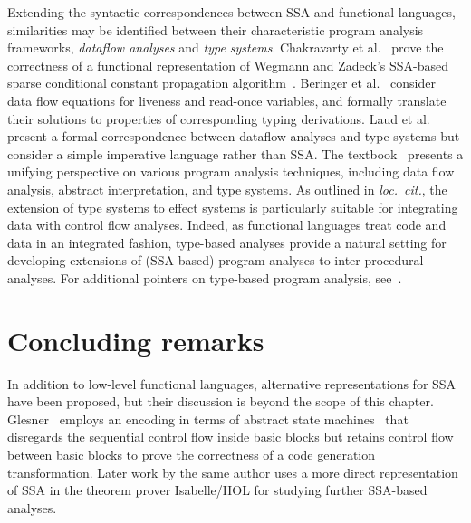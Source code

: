 
Extending the syntactic correspondences between SSA and functional
languages, similarities may be identified between their characteristic
program analysis frameworks, \emph{dataflow analyses} and \emph{type
systems}.  Chakravarty et al.~\cite{ChakravartyKZ:COCV03} prove the
correctness of a functional representation of Wegmann and Zadeck's
SSA-based sparse conditional constant propagation
algorithm~\cite{WegmannZ:Toplas1991}.  Beringer et
al.~\cite{DBLP:journals/entcs/BeringerMS03} consider data flow
equations for liveness and read-once variables, and formally translate
their solutions to properties of corresponding typing derivations.
Laud et al.~\cite{DBLP:journals/tcs/LaudUV06} present a formal
correspondence between dataflow analyses and type systems but consider
a simple imperative language rather than SSA. The
textbook~\cite{DBLP:books/daglib/0015430} presents a unifying
perspective on various program analysis techniques, including data
flow analysis, abstract interpretation, and type systems. As outlined
in \emph{loc.~cit.}, the extension of type systems to effect systems
is particularly suitable for integrating data with control flow
analyses. Indeed, as functional languages treat code and data in an
integrated fashion, type-based analyses provide a natural setting for
developing extensions of (SSA-based) program analyses to
inter-procedural analyses. For additional pointers on type-based
program analysis, see~\cite{Palsberg:2001:TAA:379605.379635}.
%


\section{Concluding remarks}
\label{section:Part1:Semantics:Conclusion}
In addition to low-level functional languages, alternative
representations for SSA have been proposed, but their discussion is
beyond the scope of this chapter.
Glesner~\cite{DBLP:conf/asm/Glesner04} employs an encoding in terms of
abstract state machines~\cite{DBLP:journals/tocl/Gurevich00} that
disregards the sequential control flow inside basic blocks but retains
control flow between basic blocks to prove the correctness of a code
generation transformation. Later work by the same author uses a more
direct representation of SSA in the theorem prover Isabelle/HOL for
studying further SSA-based analyses.

